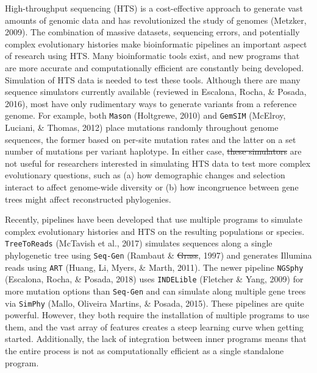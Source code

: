 \documentclass[12pt,]{article}
\providecommand{\DIFaddtex}[1]{{\protect\color{blue}\uwave{#1}}} %
\providecommand{\DIFdeltex}[1]{{\protect\color{red}\sout{#1}}}                      %
\providecommand{\DIFaddbegin}{} %
\providecommand{\DIFaddend}{} %
\providecommand{\DIFdelbegin}{} %
\providecommand{\DIFdelend}{} %
\providecommand{\DIFadd}[1]{\texorpdfstring{\DIFaddtex{#1}}{#1}} %
\providecommand{\DIFdel}[1]{\texorpdfstring{\DIFdeltex{#1}}{}} %
\newcommand{\DIFscaledelfig}{0.5}
\newlength{\DIFdelgraphicswidth} %
\newlength{\DIFdelgraphicsheight} %
\newcommand{\DIFaddincludegraphics}[2][]{{\color{blue}\fbox{\DIFOincludegraphics[#1]{#2}}}} %
\newcommand{\DIFdelincludegraphics}[2][]{%
\sbox{\DIFdelgraphicsbox}{\DIFOincludegraphics[#1]{#2}}%
\settoboxwidth{\DIFdelgraphicswidth}{\DIFdelgraphicsbox} %
\settoboxtotalheight{\DIFdelgraphicsheight}{\DIFdelgraphicsbox} %
\scalebox{\DIFscaledelfig}{%
\parbox[b]{\DIFdelgraphicswidth}{\usebox{\DIFdelgraphicsbox}\\[-\baselineskip] \rule{\DIFdelgraphicswidth}{0em}}\llap{\resizebox{\DIFdelgraphicswidth}{\DIFdelgraphicsheight}{%
\setlength{\unitlength}{\DIFdelgraphicswidth}%
\begin{picture}(1,1)%
\thicklines\linethickness{2pt} %
{\color[rgb]{1,0,0}\put(0,0){\framebox(1,1){}}}%
{\color[rgb]{1,0,0}\put(0,0){\line( 1,1){1}}}%
{\color[rgb]{1,0,0}\put(0,1){\line(1,-1){1}}}%
\end{picture}%
}\hspace*{3pt}}} %
} %
\DeclareRobustCommand{\DIFaddbegin}{\DIFOaddbegin \let\includegraphics\DIFaddincludegraphics} %
\DeclareRobustCommand{\DIFaddend}{\DIFOaddend \let\includegraphics\DIFOincludegraphics} %
\DeclareRobustCommand{\DIFdelbegin}{\DIFOdelbegin \let\includegraphics\DIFdelincludegraphics} %
\DeclareRobustCommand{\DIFdelend}{\DIFOaddend \let\includegraphics\DIFOincludegraphics} %
\begin{document}
High-throughput sequencing (HTS) is a cost-effective approach to generate vast amounts
of genomic data and has revolutionized the study of genomes
(Metzker, 2009).
The combination of massive datasets, sequencing errors, and potentially complex
evolutionary histories make bioinformatic pipelines an important aspect of
research using HTS.
Many bioinformatic tools exist, and new programs that are more accurate and
computationally efficient are constantly being developed.
Simulation of HTS data is needed to test these tools.
Although there are many sequence simulators currently available
(reviewed in Escalona, Rocha, \& Posada, 2016),
most have only rudimentary ways to generate variants from a reference genome.
For example, both \texttt{Mason} (Holtgrewe, 2010) and \texttt{GemSIM} (McElroy, Luciani, \& Thomas, 2012) place mutations
randomly throughout genome sequences, the former based on per-site mutation rates
and the latter on a set number of mutations per variant haplotype.
In either case, \DIFdelbegin \DIFdel{these simulators }\DIFdelend \DIFaddbegin \DIFadd{simulations alone }\DIFaddend are not useful for researchers interested
in simulating HTS data to test more complex evolutionary questions, such as
(a) how demographic changes and selection interact to affect genome-wide diversity or
(b) how incongruence between gene trees might affect reconstructed phylogenies.

Recently, pipelines have been developed that use multiple programs
to simulate complex evolutionary histories and HTS on the resulting populations
or species.
\texttt{TreeToReads} (McTavish et al., 2017) simulates sequences along a single
phylogenetic tree using \texttt{Seq-Gen} (Rambaut \& \DIFdelbegin \DIFdel{Grass}\DIFdelend \DIFaddbegin \DIFadd{Grassly}\DIFaddend , 1997)
and generates Illumina reads using \texttt{ART} (Huang, Li, Myers, \& Marth, 2011).
The newer pipeline \texttt{NGSphy} (Escalona, Rocha, \& Posada, 2018) uses \texttt{INDELible} (Fletcher \& Yang, 2009)
for more mutation options than \texttt{Seq-Gen} and
can simulate along multiple gene trees via \texttt{SimPhy} (Mallo, Oliveira Martins, \& Posada, 2015).
These pipelines are quite powerful.
However, they both require the installation of multiple programs to use them,
and the vast array of features creates a steep learning curve when getting started.
Additionally, the lack of integration between inner programs means that the
entire process is not as computationally efficient as a single standalone program.
\end{document}
